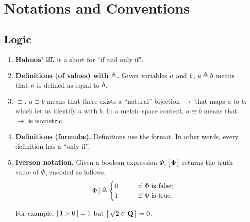 \renewcommand{\labelenumi}{\arabic{enumi}.}
\chapter*{Notations and Conventions}
\section{Logic}
\begin{enumerate}
\item{{\bf Halmos' iff.} \iif is a short for ``if and only if".}
\item{{\bf Definitions (of values) with $\triangleq$.} Given variables %
$\mathit{a}$ and $\mathit{b}$, %
$a\triangleq b$ means that $\mathit{a}$ is defined as equal to $\mathit{b}$.}
\item{{\bf $\equiv$.} $a\equiv b$ means that there exists a ``natural'' %
bijection $\to$ that maps $a$ to $b$; which let us identify $a$ with $b$. %
In a metric space context, $a\equiv b$ means that $\to$ is isometric.}
\item{{\bf Definitions (formul\ae).} Definitions use the \iif format. %
In other words, every definition has a ``only if''. %
}
\item{{\bf Iverson notation.} Given a boolean expression $\Phi$, %
$\left[\,\Phi\,\right]$ returns the truth value of $\Phi$, encoded as follows, %
%
  \begin{align} \nonumber
    \left[\,\Phi\,\right]\triangleq 
    \begin{cases}
      0 & \quad\quad \text{if } \Phi \text{ is false;} \\
      1 & \quad\quad \text{if } \Phi \text{ is true.}
    \end{cases}
  \end{align}

For example, $\left[\,1 > 0\,\right] = 1$ but $\left[\, \sqrt{2} \in {\mathbf Q}\,\right] = 0$.
}
\end{enumerate}
